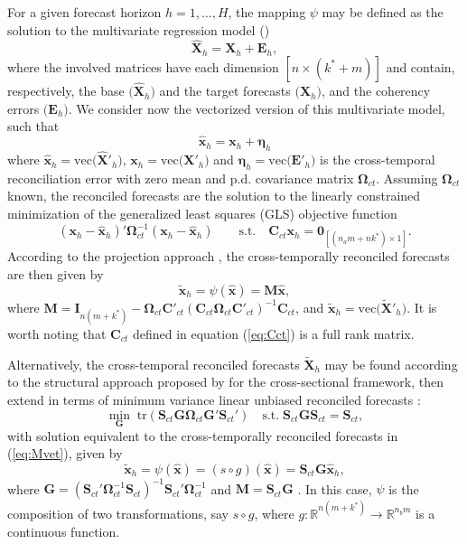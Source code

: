 \documentclass[a4paper,11pt]{article}
\newcommand{\etavet}{\bm{\eta}}
\newcommand{\xvet}{\bm{x}}
\newcommand{\Cvet}{\bm{C}}
\newcommand{\Evet}{\bm{E}}
\newcommand{\Gvet}{\bm{G}}
\newcommand{\Ivet}{\bm{I}}
\newcommand{\Mvet}{\bm{M}}
\newcommand{\Svet}{\bm{S}}
\newcommand{\Xvet}{\bm{X}}
\newcommand{\Zerovet}{\bm{0}}
\newcommand{\Omegavet}{\bm{\Omega}}
\theoremstyle{definition}
\begin{document}
For a given forecast horizon $h = 1,\dots, H$, the mapping $\psi$ may be defined as the solution to the multivariate regression model (\citealp{difonzo2023})
$$
\widehat{\Xvet}_{h} = \Xvet_{h} + \Evet_{h},
$$
where the involved matrices have each dimension $[n \times (k^\ast + m)]$ and contain, respectively, the base $\Big(\widehat{\Xvet}_{h}\Big)$ and the target forecasts $\Big(\Xvet_{h}\Big)$, and the coherency errors $\Big(\Evet_{h}\Big)$. We consider now the vectorized version of this multivariate model, such that
$$
\widehat{\xvet}_{h} = \xvet_{h} + \etavet_{h}
$$
where $\widehat{\xvet}_{h} = \mathrm{vec}\Big(\widehat{\Xvet}'_{h}\Big)$, $\xvet_{h} = \mathrm{vec}\Big(\Xvet'_{h}\Big)$ and $\etavet_{h} = \mathrm{vec}\Big(\Evet'_{h}\Big)$  is the cross-temporal reconciliation error with zero mean and p.d. covariance matrix $\Omegavet_{ct}$.
Assuming $\Omegavet_{ct}$ known, the reconciled forecasts are the solution to the linearly constrained minimization of the generalized least squares (GLS) objective function
$$
\left(\xvet_h - \widehat{\xvet}_h\right)' \Omegavet_{ct}^{-1}\left(\xvet_h - \widehat{\xvet}_h\right)  \qquad \text{s.t.} \quad \Cvet_{ct}\xvet_h = \Zerovet_{[(n_am+nk^\ast)\times1]}.
$$
According to the projection approach \citep{byron1978,byron1979, vanerven2015, wickramasuriya2019, panagiotelis2021, difonzo2023}, the cross-temporally reconciled forecasts are then given by
\begin{equation}
	\label{eq:Mvet}
	\widetilde{\xvet}_{h} = \psi\left(\widehat{\xvet}\right) = \Mvet \widehat{\xvet},
\end{equation}
where $\Mvet = \Ivet_{n(m+ k^\ast)} - \Omegavet_{ct}\Cvet'_{ct}\left(\Cvet_{ct}\Omegavet_{ct}\Cvet'_{ct}\right)^{-1}\Cvet_{ct}$, and $\widetilde{\xvet}_{h} = \mathrm{vec}\Big(\widetilde{\Xvet}'_{h}\Big)$. It is worth noting that $\Cvet_{ct}$ defined in equation (\ref{eq:Cct}) is a full rank matrix.

Alternatively, the cross-temporal reconciled forecasts $\widetilde{\Xvet}_{h}$ may be found according to the structural approach proposed by \cite{hyndman2011} for the cross-sectional framework, then extend in terms of minimum variance linear unbiased reconciled forecasts \citep{wickramasuriya2019}:
$$
\min_{\Gvet} \; \text{tr}\left(\Svet_{ct}\Gvet\Omegavet_{ct}\Gvet'\Svet_{ct}' \right) \quad \text{s.t.} \; \Svet_{ct}\Gvet\Svet_{ct} = \Svet_{ct},
$$
with solution equivalent to the cross-temporally reconciled forecasts in (\ref{eq:Mvet}), given by
\begin{equation}\label{eq:SGy}
	\widetilde{\xvet}_{h} = \psi\left(\widehat{\xvet}\right) = \left(s \circ g \right)\left(\widehat{\xvet}\right)=\Svet_{ct}\Gvet \widehat{\xvet}_{h},
\end{equation}
where $\Gvet = \left(\Svet_{ct}' \Omegavet_{ct}^{-1}\Svet_{ct}\right)^{-1} \Svet_{ct}'\Omegavet_{ct}^{-1}$ and $\Mvet = \Svet_{ct} \Gvet$ \citep{wickramasuriya2019, difonzo2023}. In this case, $\psi$ is the composition of two transformations, say $s \circ g$, where $g: \mathbb{R}^{n(m+k^\ast)} \rightarrow \mathbb{R}^{n_b m}$ is a continuous function.
\end{document}
